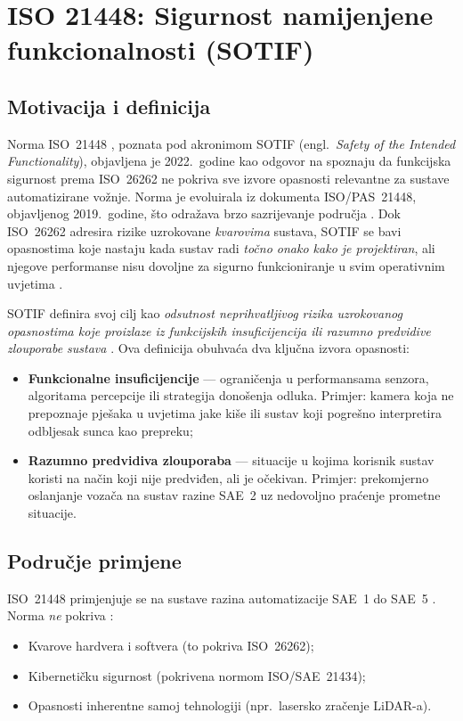 \section{ISO 21448: Sigurnost namijenjene funkcionalnosti (SOTIF)}
\label{sec:sotif}

\subsection{Motivacija i definicija}

Norma ISO~21448 \cite{iso21448}, poznata pod akronimom SOTIF (engl.\ \textit{Safety of the Intended Functionality}), objavljena je 2022.\ godine kao odgovor na spoznaju da funkcijska sigurnost prema ISO~26262 ne pokriva sve izvore opasnosti relevantne za sustave automatizirane vožnje. Norma je evoluirala iz dokumenta ISO/PAS~21448, objavljenog 2019.\ godine, što odražava brzo sazrijevanje područja \cite{patel2025sotifslr}. Dok ISO~26262 adresira rizike uzrokovane \textit{kvarovima} sustava, SOTIF se bavi opasnostima koje nastaju kada sustav radi \textit{točno onako kako je projektiran}, ali njegove performanse nisu dovoljne za sigurno funkcioniranje u svim operativnim uvjetima \cite{patel2025sotifslr}.

SOTIF definira svoj cilj kao \textit{odsutnost neprihvatljivog rizika uzrokovanog opasnostima koje proizlaze iz funkcijskih insuficijencija ili razumno predvidive zlouporabe sustava} \cite{iso21448}. Ova definicija obuhvaća dva ključna izvora opasnosti:

\begin{itemize}
  \item \textbf{Funkcionalne insuficijencije} — ograničenja u performansama senzora, algoritama percepcije ili strategija donošenja odluka. Primjer: kamera koja ne prepoznaje pješaka u uvjetima jake kiše ili sustav koji pogrešno interpretira odbljesak sunca kao prepreku;
  \item \textbf{Razumno predvidiva zlouporaba} — situacije u kojima korisnik sustav koristi na način koji nije predviđen, ali je očekivan. Primjer: prekomjerno oslanjanje vozača na sustav razine SAE~2 uz nedovoljno praćenje prometne situacije.
\end{itemize}

\subsection{Područje primjene}

ISO~21448 primjenjuje se na sustave razina automatizacije SAE~1 do SAE~5 \cite{saej3016}. Norma \textit{ne} pokriva \cite{iso21448}:
\begin{itemize}
  \item Kvarove hardvera i softvera (to pokriva ISO~26262);
  \item Kibernetičku sigurnost (pokrivena normom ISO/SAE~21434);
  \item Opasnosti inherentne samoj tehnologiji (npr.\ lasersko zračenje LiDAR-a).
\end{itemize}

